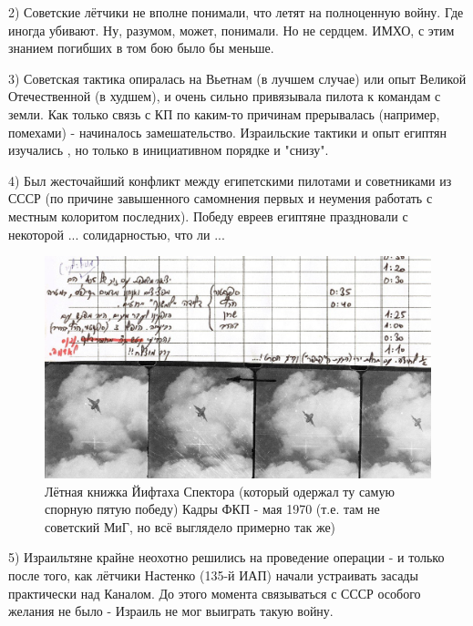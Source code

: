 2) Советские лётчики не вполне понимали, что летят на полноценную войну. Где иногда убивают. Ну, разумом, может, понимали. Но не сердцем. ИМХО, с этим знанием погибших в том бою было бы меньше.

3) Советская тактика опиралась на Вьетнам (в лучшем случае) или опыт Великой Отечественной (в худшем), и очень сильно привязывала пилота к командам с земли. Как только связь с КП по каким-то причинам прерывалась (например, помехами) - начиналось замешательство. Израильские тактики и опыт египтян изучались , но только в инициативном порядке и "снизу".

4) Был жесточайший конфликт между египетскими пилотами и советниками из СССР (по причине завышенного самомнения первых и неумения работать с местным колоритом последних). Победу евреев египтяне праздновали с некоторой ... солидарностью, что ли ...

\begin{figure}[h!tb] 
	\centering\includegraphics[scale=0.4]{Dolina_0/TXI_-INPzno.jpg}
	\caption{Лётная книжка Йифтаха Спектора (который одержал ту самую спорную пятую победу) Кадры ФКП - мая 1970 (т.е. там не советский МиГ, но всё выглядело примерно так же)}%
\end{figure}

5) Израильтяне крайне неохотно решились на проведение операции - и только после того, как лётчики Настенко (135-й ИАП) начали устраивать засады практически над Каналом. До этого момента связываться с СССР особого желания не было - Израиль не мог выиграть такую войну.

